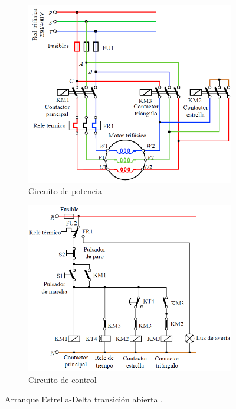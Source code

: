 \begin{figure}
	\begin{subfigure}[b]{0.49\textwidth}
		\centering
		\includegraphics[width=\textwidth]{Imagenes/Potencia-Estrella-Delta}
		\caption{Circuito de potencia}
		\label{fig:potencia-estrella-delta}
	\end{subfigure}
	\begin{subfigure}[b]{0.49\textwidth}
		\centering
		\includegraphics[width=\textwidth]{Imagenes/Control-Estrellla-Delta}
		\caption{Circuito de control}
		\label{fig:control-estrella-delta}
	\end{subfigure}
	\caption{Arranque Estrella-Delta transición abierta  \cite{Mora08}.}
\end{figure}



